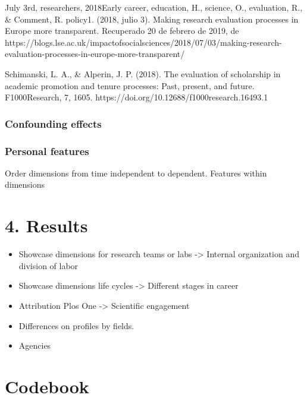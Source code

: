 \documentclass[]{elsarticle} %
\providecommand{\tightlist}{%
  \setlength{\itemsep}{0pt}\setlength{\parskip}{0pt}}
\begin{document}
July 3rd, researchers, 2018\textbar{}Early career, education, H.,
science, O., evaluation, R., \& Comment, R. policy\textbar{}1. (2018,
julio 3). Making research evaluation processes in Europe more
transparent. Recuperado 20 de febrero de 2019, de
https://blogs.lse.ac.uk/impactofsocialsciences/2018/07/03/making-research-evaluation-processes-in-europe-more-transparent/

Schimanski, L. A., \& Alperin, J. P. (2018). The evaluation of
scholarship in academic promotion and tenure processes: Past, present,
and future. F1000Research, 7, 1605.
https://doi.org/10.12688/f1000research.16493.1

\hypertarget{confounding-effects}{%
\subsubsection{Confounding effects}\label{confounding-effects}}

\hypertarget{personal-features}{%
\subsubsection{Personal features}\label{personal-features}}

Order dimensions from time independent to dependent. Features within
dimensions

\hypertarget{results}{%
\section{4. Results}\label{results}}

\begin{itemize}
\tightlist
\item
  Showcase dimensions for research teams or labs -\textgreater{}
  Internal organization and division of labor
\item
  Showcase dimensions life cycles -\textgreater{} Different stages in
  career
\item
  Attribution Plos One -\textgreater{} Scientific engagement
\item
  Differences on profiles by fields.
\item
  Agencies
\end{itemize}

\pagebreak

\hypertarget{codebook}{%
\section{Codebook}\label{codebook}}
\end{document}
